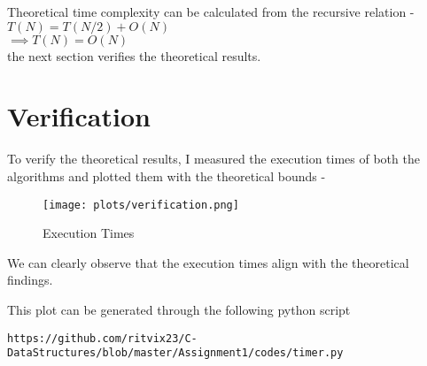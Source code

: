 \documentclass[journal,12pt,twocolumn]{IEEEtran}
\begin{document}
Theoretical time complexity can be calculated from the recursive relation - \\
$T(N)  = T(N/2) + O(N)$ \\
$\implies T(N) = O(N)$ \\
the next section  verifies the theoretical results. 
\section{Verification}
To verify the theoretical results, I measured the execution times of both the algorithms and plotted them with the theoretical bounds - 

\begin{figure}[!h]
    \centering
    \texttt{[image: plots/verification.png]}
    \caption{Execution Times}
    \label{fig:verification}
\end{figure}

We can clearly observe that the execution times align with the theoretical findings.

This plot can be generated through the following python script
\begin{lstlisting}
https://github.com/ritvix23/C-DataStructures/blob/master/Assignment1/codes/timer.py
\end{lstlisting}
\end{document}
